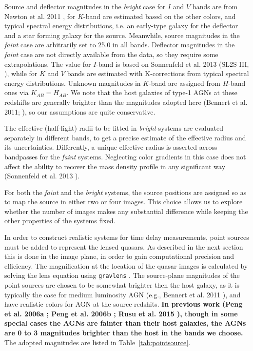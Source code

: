 \documentclass[a4paper,11pt]{article}
\begin{document}
Source and deflector magnitudes in the \textit{bright} case for $I$ and
$V$ bands are from Newton et al. 2011 \cite{2011ApJ...734..104N}, for
$K$-band are estimated based on the other colors, and typical spectral
energy distributions, i.e. an early-type galaxy for the deflector and
a star forming galaxy for the source. Meanwhile, source magnitudes in
the \textit{faint} case are arbitrarily set to 25.0 in all
bands. Deflector magnitudes in the \textit{faint} case are not
directly available from the data, so they require some
extrapolations. The value for $I$-band is based on Sonnenfeld et
al. 2013 (SL2S III,
\cite{2013ApJ...777...97S}), while for $K$ and $V$ bands are estimated
with K-corrections from typical spectral energy distributions. Unknown
magnitudes in $K$-band are assigned from $H$-band ones via
$K_{AB}=H_{AB}$. We note that the host galaxies of type-1 AGNs at
these redshifts are generally brighter than the magnitudes adopted
here (Bennert et al. 2011; \cite{2011ApJ...742..107B}), so our
assumptions are quite conservative.

The effective (half-light) radii to be fitted in \textit{bright}
systems are evaluated separately in different bands, to get a precise
estimate of the effective radius and its uncertainties. Differently, a
unique effective radius is asserted across bandpasses for the
\textit{faint} systems. Neglecting color gradients in this case does
not affect the ability to recover the mass density profile in any
significant way
(Sonnenfeld et al. 2013 \cite{2013ApJ...777...97S}).

For both the \textit{faint} and the \textit{bright} systems, the source positions are
assigned so as to map the source in either two or four images. This
choice allows us to explore whether the number of images makes any
substantial difference while keeping the other properties of the
systems fixed.

In order to construct realistic systems for time delay measurements,
point sources must be added to represent the lensed quasars. As
described in the next section this is done in the image plane, in
order to gain computational precision and efficiency. The
magnification at the location of the quasar images is calculated by
solving the lens equation using \texttt{gravlens}
\cite{2011ascl.soft02003K}. The source-plane magnitudes of the point
sources are chosen to be somewhat brighter then the host galaxy, as it
is typically the case for medium luminosity AGN
(e.g., Bennert et al. 2011 \cite{2011ApJ...726...59B}), and have realistic colors for AGN at the
source redshits. {\bf In previous work (Peng et al. 2006a \cite{2006ApJ...640..114P}; 
Peng et al. 2006b \cite{2006NewAR..50..689P}; Rusu et al. 2015 \cite{2015arXiv150605147R}), 
though in some special cases the AGNs are fainter than their host galaxies, 
the AGNs are 0 to 3 magnitudes brighter than the host in the bands we choose.}
The adopted magnitudes are listed in
Table~\ref{tab:pointsource}.
\end{document}
